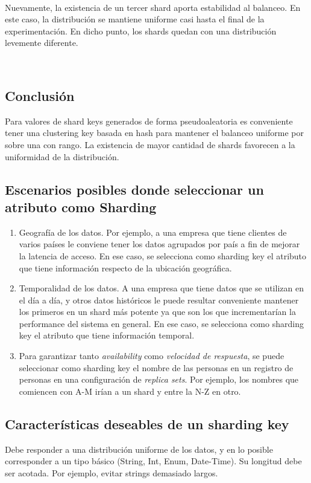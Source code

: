~

Nuevamente, la existencia de un tercer shard aporta estabilidad al balanceo. En este caso, la distribución
se mantiene uniforme casi hasta el final de la experimentación. En dicho punto, los shards quedan
con una distribución levemente diferente.

~

\subsection{Conclusión}

Para valores de shard keys generados de forma pseudoaleatoria es conveniente tener una clustering key
basada en hash para mantener el balanceo uniforme por sobre una con rango.
La existencia de mayor cantidad de shards favorecen a la uniformidad de la distribución.

\subsection{Escenarios posibles donde seleccionar un atributo como Sharding}

\begin{enumerate}
\item Geografía de los datos. Por ejemplo, a una empresa que tiene clientes de varios
países le conviene tener los datos agrupados por país a fin de mejorar la latencia de acceso.
En ese caso, se selecciona como sharding key el atributo que tiene información respecto de la
ubicación geográfica.
\item Temporalidad de los datos. A una empresa que tiene datos que se utilizan en el día a día,
y otros datos históricos le puede resultar conveniente mantener los primeros en un shard más
potente ya que son los que incrementarían la performance del sistema en general. En ese caso,
se selecciona como sharding key el atributo que tiene información temporal.
\item Para garantizar tanto \emph{availability} como \emph{velocidad de respuesta}, se puede
seleccionar como sharding key el nombre de las personas en un registro de personas en una
configuración de \emph{replica sets}. Por ejemplo, los nombres que comiencen con A-M irían a
un shard y entre la N-Z en otro.
\end{enumerate}

\subsection{Características deseables de un sharding key}

Debe responder a una distribución uniforme de los datos, y en lo posible corresponder a un tipo básico
(String, Int, Enum, Date-Time). Su longitud debe ser acotada. Por ejemplo, evitar strings demasiado largos.



